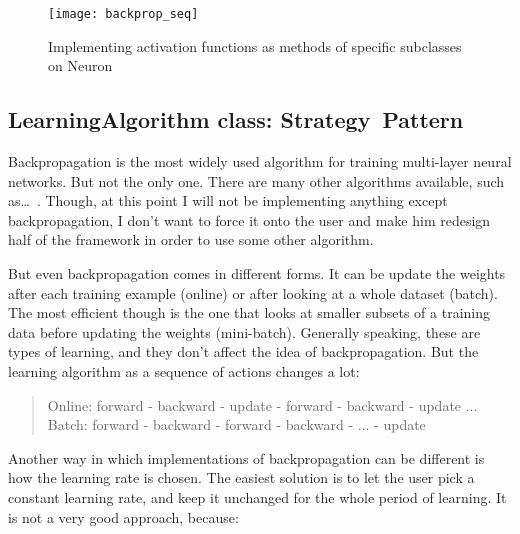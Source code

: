 \begin{figure}[H]
  \centering
  \texttt{[image: backprop\_seq]}
  \caption{Implementing activation functions as methods of specific subclasses on Neuron}
  \label{fig:backprop_seq}
\end{figure}

\subsection{LearningAlgorithm class: Strategy Pattern}
Backpropagation is the most widely used algorithm for training multi-layer neural networks. But not the only one. There are many other algorithms available, such as… . Though, at this point I will not be implementing anything except backpropagation, I don’t want to force it onto the user and make him redesign half of the framework in order to use some other algorithm.

But even backpropagation comes in different forms. It can be update the weights after each training example (online) or after looking at a whole dataset (batch). The most efficient though is the one that looks at smaller subsets of a training data before updating the weights (mini-batch). Generally speaking, these are types of learning, and they don’t affect the idea of backpropagation. But the learning algorithm as a sequence of actions changes a lot:

\begin{quote}
Online: forward - backward - update - forward - backward - update ...
Batch: forward - backward - forward - backward - ... - update
\end{quote}

Another way in which implementations of backpropagation can be different is how the learning rate is chosen. The easiest solution is to let the user pick a constant learning rate, and keep it unchanged for the whole period of learning. It is not a very good approach, because:

